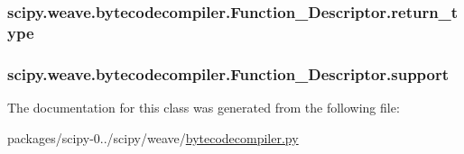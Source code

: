 \subsubsection[{return\+\_\+type}]{\setlength{\rightskip}{0pt plus 5cm}scipy.\+weave.\+bytecodecompiler.\+Function\+\_\+\+Descriptor.\+return\+\_\+type}\label{classscipy_1_1weave_1_1bytecodecompiler_1_1Function__Descriptor_a4456b0a791394c790bf7939c3a26b305}
\hypertarget{classscipy_1_1weave_1_1bytecodecompiler_1_1Function__Descriptor_a55e8b4d363dd1d6725fddb8522f9126e}{}
\subsubsection[{support}]{\setlength{\rightskip}{0pt plus 5cm}scipy.\+weave.\+bytecodecompiler.\+Function\+\_\+\+Descriptor.\+support}\label{classscipy_1_1weave_1_1bytecodecompiler_1_1Function__Descriptor_a55e8b4d363dd1d6725fddb8522f9126e}


The documentation for this class was generated from the following file\+:\begin{DoxyCompactItemize}
\item 
packages/scipy-\/0../scipy/weave/\hyperlink{bytecodecompiler_8py}{bytecodecompiler.\+py}\end{DoxyCompactItemize}
